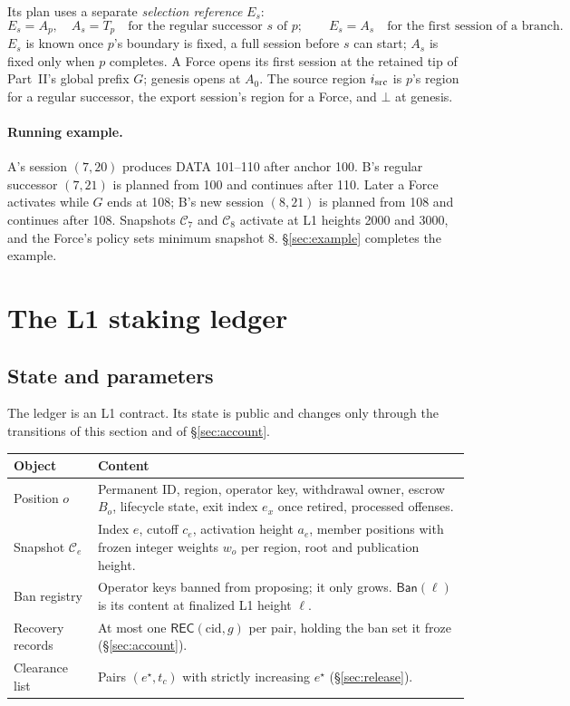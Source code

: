 \documentclass[11pt,a4paper]{article}
\newcommand{\tagg}[1]{\mathsf{#1}}
\newcommand{\cfg}{\mathcal C}
\newcommand{\Ban}{\mathsf{Ban}}
\newcommand{\cid}{\mathrm{cid}}
\begin{document}
Its plan uses a separate \emph{selection reference} $E_s$:
\[
 E_s=A_p,\quad A_s=T_p\quad\text{for the regular successor $s$ of $p$};
 \qquad E_s=A_s\quad\text{for the first session of a branch.}
\]
$E_s$ is known once $p$'s boundary is fixed, a full session before $s$
can start; $A_s$ is fixed only when $p$ completes. A Force opens its
first session at the retained tip of Part~II's global prefix $G$; genesis
opens at $A_0$. The source region $i_{\rm src}$ is $p$'s region for a
regular successor, the export session's region for a Force, and $\bot$
at genesis.

\paragraph{Running example.}
A's session $(7,20)$ produces DATA 101--110 after anchor 100. B's regular
successor $(7,21)$ is planned from 100 and continues after 110. Later a
Force activates while $G$ ends at 108; B's new session $(8,21)$ is planned
from 108 and continues after 108. Snapshots $\cfg_7$ and $\cfg_8$ activate
at L1 heights 2000 and 3000, and the Force's policy sets minimum snapshot
8. \S\ref{sec:example} completes the example.

\section{The L1 staking ledger}
\label{sec:ledger}
\subsection{State and parameters}
The ledger is an L1 contract. Its state is public and changes only
through the transitions of this section and of \S\ref{sec:account}.

\begin{tabularx}{\linewidth}{@{}>{\raggedright\arraybackslash}p{.20\linewidth}Y@{}}\toprule
Object & Content\\\midrule
Position $o$ & Permanent ID, region, operator key, withdrawal owner,
escrow $B_o$, lifecycle state, exit index $e_x$ once retired, processed
offenses.\\
Snapshot $\cfg_e$ & Index $e$, cutoff $c_e$, activation height $a_e$,
member positions with frozen integer weights $w_o$ per region, root and
publication height.\\
Ban registry & Operator keys banned from proposing; it only grows.
$\Ban(\ell)$ is its content at finalized L1 height $\ell$.\\
Recovery records & At most one $\tagg{REC}(\cid,g)$ per pair, holding the
ban set it froze (\S\ref{sec:account}).\\
Clearance list & Pairs $(e^\star,t_c)$ with strictly increasing
$e^\star$ (\S\ref{sec:release}).\\\bottomrule
\end{tabularx}
\end{document}
